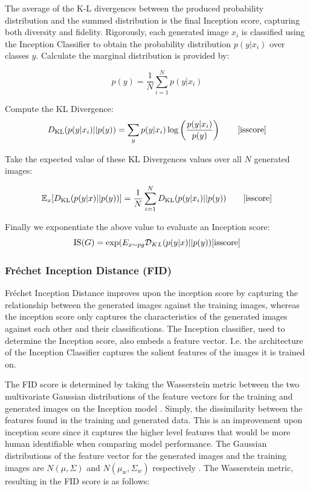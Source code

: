 \documentclass[%
 reprint,
 amsmath,amssymb,
 aps,
]{revtex4-2}
\begin{document}
The average of the K-L divergences between the produced probability distribution and the summed distribution is the final Inception score, capturing both diversity and fidelity.
Rigorously, each generated image $x_i$ is classified using the Inception Classifier to obtain the probability distribution $p(y|x_i)$ over classes $y$\cite{isscore}. Calculate the marginal distribution is provided by: 

\begin{equation}
p(y) = \frac{1}{N} \sum_{i=1}^{N} p(y|x_i)
\end{equation}

Compute the KL Divergence:
\begin{equation}
    D_{\text{KL}}(p(y|x_i) || p(y)) = \sum_{y} p(y|x_i) \log \left( \frac{p(y|x_i)}{p(y)} \right)\qquad
    \cite{isscore}
\end{equation}

Take the expected value of these KL Divergences values over all $N$ generated images:

\begin{equation}
    \mathbb{E}_{x}[D_{\text{KL}}(p(y|x) || p(y))] = \frac{1}{N} \sum_{i=1}^{N} D_{\text{KL}}(p(y|x_i) || p(y))\qquad
\cite{isscore}
\end{equation}

Finally we exponentiate the above value to evaluate an Inception score:
\begin{equation}
\text{IS}(G) = \exp (E_{x\sim pg} \mathcal{D}_{KL}( p(y|x) || p(y) )
\cite{isscore}
\end{equation}

\subsubsection{Fréchet Inception Distance (FID)}
Fréchet Inception Distance improves upon the inception score by capturing the relationship between the generated images against the training images, whereas the inception score only captures the characteristics of the generated images against each other and their classifications. The Inception classifier, used to determine the Inception score, also embeds a feature vector. I.e. the architecture of the Inception Classifier captures the salient features of the images it is trained on.



The FID score is determined by taking the Wasserstein metric between the two multivariate Gaussian distributions of the feature vectors for the training and generated images on the Inception model \cite{NIPS2017_8a1d6947}. Simply, the dissimilarity between the features found in the training and generated data. This is an improvement upon inception score since it captures the higher level features that would be more human identifiable when comparing model performance. The Gaussian distributions of the feature vector for the generated images and the training images are $N(\mu, \Sigma)$ and $N(\mu_w, \Sigma_w)$ respectively \cite{fid_gan}. The Wasserstein metric, resulting in the FID score is as follows:
\end{document}
